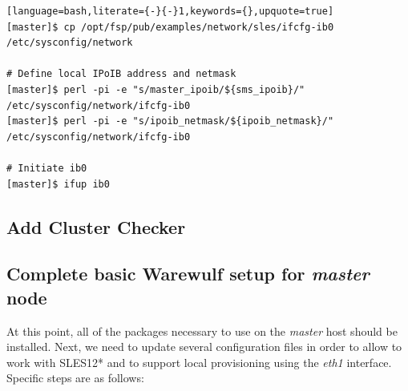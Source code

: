 \documentclass[letterpaper]{article}
\newcommand{\baseOS}{SLES12*}
\begin{document}
\begin{lstlisting}[language=bash,literate={-}{-}1,keywords={},upquote=true]
[master]$ cp /opt/fsp/pub/examples/network/sles/ifcfg-ib0 /etc/sysconfig/network

# Define local IPoIB address and netmask
[master]$ perl -pi -e "s/master_ipoib/${sms_ipoib}/" /etc/sysconfig/network/ifcfg-ib0
[master]$ perl -pi -e "s/ipoib_netmask/${ipoib_netmask}/" /etc/sysconfig/network/ifcfg-ib0

# Initiate ib0
[master]$ ifup ib0
\end{lstlisting}

\subsection{Add Cluster Checker} \label{sec:add_clck}


\subsection{Complete basic Warewulf setup for {\em master} node} \label{sec:setup_ww}

At this point, all of the packages necessary to use \Warewulf{} on the {\em
  master} host should be installed.  Next, we need to update several
configuration files in order to allow \Warewulf{} to work with \baseOS{} and to support
local provisioning using the {\em eth1} interface.  Specific steps are as
follows:

\end{document}
